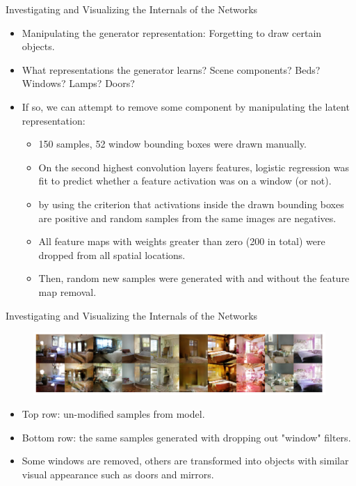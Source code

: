 \documentclass[10pt]{beamer}
\begin{document}
	\begin{frame}{Investigating and Visualizing the Internals of the Networks}
		\begin{itemize}
			\item Manipulating the generator representation: Forgetting to draw certain objects.
			\pause
			\item What representations the generator learns? Scene components? Beds? Windows? Lamps? Doors?
			\pause
			\item If so, we can attempt to remove some component by manipulating the latent representation:
			\begin{itemize}
				\pause
				\item 150 samples, 52 window bounding boxes were drawn manually.
				\pause
				\item On the second highest convolution layers features, logistic regression was fit to predict whether a feature activation was on a window (or not).
				\pause
				\item by using the criterion that activations inside the drawn bounding boxes are positive and random samples from the same images are negatives.
				\pause
				\item All feature maps with weights greater than zero (200 in total) were dropped from all spatial locations.
				\pause
				\item Then, random new samples were generated with and without the feature map removal.
			\end{itemize}
		\end{itemize}
	\end{frame}

	\begin{frame}{Investigating and Visualizing the Internals of the Networks}
		\begin{figure}
			\includegraphics[width=30em]{figures/DCGAN-visualizing-internals-remove-filter.png}
		\end{figure}
		\begin{itemize}
			\item Top row: un-modified samples from model.
			\item Bottom row: the same samples generated with dropping out "window" filters.
			\item Some windows are removed, others are transformed into objects with similar visual appearance such as doors and mirrors.
		\end{itemize}
	\end{frame}
	
\end{document}
